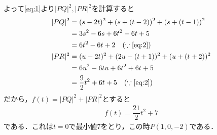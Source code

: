 \documentclass[../../main.tex]{subfiles}
\begin{document}
よって\cref{eq:1}より$|PQ|^2, |PR|^2$を計算すると
\begin{align}
  |PQ|^2
  &=(s-2t)^2+(s+(t-2))^2+(s+(t-1))^2\\
  &=3s^2-6s+6t^2-6t+5\\
  &=6t^2-6t+2  \quad (\because\text{\cref{eq:2}}) \label{eq:3} \\
  |PR|^2
  &=(u-2t)^2+(2u-(t+1))^2+(u+(t+2))^2\\
  &=6u^2-6tu+6t^2+6t+5\\
  &=\dfrac{9}{2}t^2+6t+5 \quad (\because\text{\cref{eq:2}}) \label{eq:4}
\end{align}
だから，$f(t)=|PQ|^2+|PR|^2$とすると
\begin{align}
  f(t)=\dfrac{21}{2}t^2+7
\end{align}
である．これは$t=0$で最小値$7$をとり，この時$P(1,0,-2)$である．

\newpage
\end{document}
